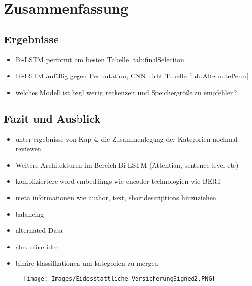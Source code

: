 \documentclass[a4paper,11pt]{article}
\begin{document}
\section{Zusammenfassung}

\subsection{Ergebnisse}

\begin{itemize}
    \item Bi-LSTM performt am besten Tabelle \ref{tab:finalSelection}
    \item Bi-LSTM anfällig gegen Permutation, CNN nicht Tabelle \ref{tab:AlternatePerm}
    \item welches Modell ist bzgl wenig rechenzeit und Speichergröße zu empfehlen?
\end{itemize}{}



\subsection{Fazit und Ausblick}

\begin{itemize}
\item unter ergebnisse von Kap 4, die Zusammenlegung der Kategorien nochmal reviewen
    \item Weitere Architekturen im Bereich Bi-LSTM (Attention, sentence level etc)
    \item kompliziertere word embeddings wie encoder technologien wie BERT
    \item meta informationen wie author, text, shortdescriptions hinzuziehen
    \item balancing
    \item alternated Data
    \item alex seine idee
    \item binäre klassifkationen um kategorien zu mergen 
\end{itemize}


\newpage

\printbibliography[
heading=bibintoc,
title={Literaturverzeichnis}
]



\begin{figure}
    \centering
    \vspace*{-2cm}
    \hspace*{-3cm}    
\texttt{[image: Images/Eidesstattliche\_VersicherungSigned2.PNG]}

\end{figure}{}

%
\end{document}
